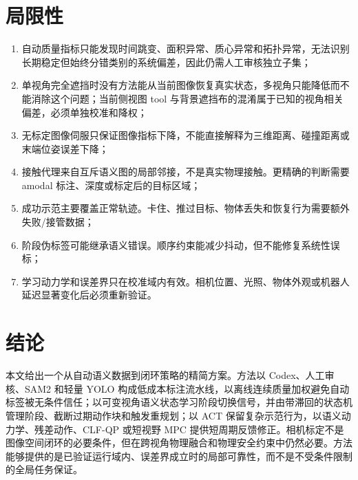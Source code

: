 \documentclass[UTF8,a4paper,11pt]{ctexart}
\begin{document}
\section{局限性}

\begin{enumerate}[leftmargin=2.3em]
  \item 自动质量指标只能发现时间跳变、面积异常、质心异常和拓扑异常，无法识别长期稳定但始终分错类别的系统偏差，因此仍需人工审核独立子集；
  \item 单视角完全遮挡时没有方法能从当前图像恢复真实状态，多视角只能降低而不能消除这个问题；当前侧视图 tool 与背景遮挡布的混淆属于已知的视角相关偏差，必须单独校准和降权；
  \item 无标定图像伺服只保证图像指标下降，不能直接解释为三维距离、碰撞距离或末端位姿误差下降；
  \item 接触代理来自互斥语义图的局部邻接，不是真实物理接触。更精确的判断需要 amodal 标注、深度或标定后的目标区域；
  \item 成功示范主要覆盖正常轨迹。卡住、推过目标、物体丢失和恢复行为需要额外失败/接管数据；
  \item 阶段伪标签可能继承语义错误。顺序约束能减少抖动，但不能修复系统性误标；
  \item 学习动力学和误差界只在校准域内有效。相机位置、光照、物体外观或机器人延迟显著变化后必须重新验证。
\end{enumerate}

\section{结论}

本文给出一个从自动语义数据到闭环策略的精简方案。方法以 Codex、人工审核、SAM2 和轻量 YOLO 构成低成本标注流水线，以离线连续质量加权避免自动标签被无条件信任；以可变视角语义状态学习阶段切换信号，并由带滞回的状态机管理阶段、截断过期动作块和触发重规划；以 ACT 保留复杂示范行为，以语义动力学、残差动作、CLF-QP 或短视野 MPC 提供短周期反馈修正。相机标定不是图像空间闭环的必要条件，但在跨视角物理融合和物理安全约束中仍然必要。方法能够提供的是已验证运行域内、误差界成立时的局部可靠性，而不是不受条件限制的全局任务保证。



\end{document}
